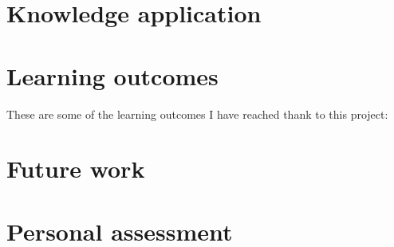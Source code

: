 \documentclass[a4paper, 12pt]{book}
\begin{document}
\section{Knowledge application}
\label{sec:knowledge-application}


\section{Learning outcomes}
\label{sec:learning-outcomes}
These are some of the learning outcomes I have reached thank to this project:


\section{Future work}
\label{sec:future-work}



\section{Personal assessment}
\label{sec:assessment}


\cleardoublepage



\cleardoublepage
\appendix
\end{document}
